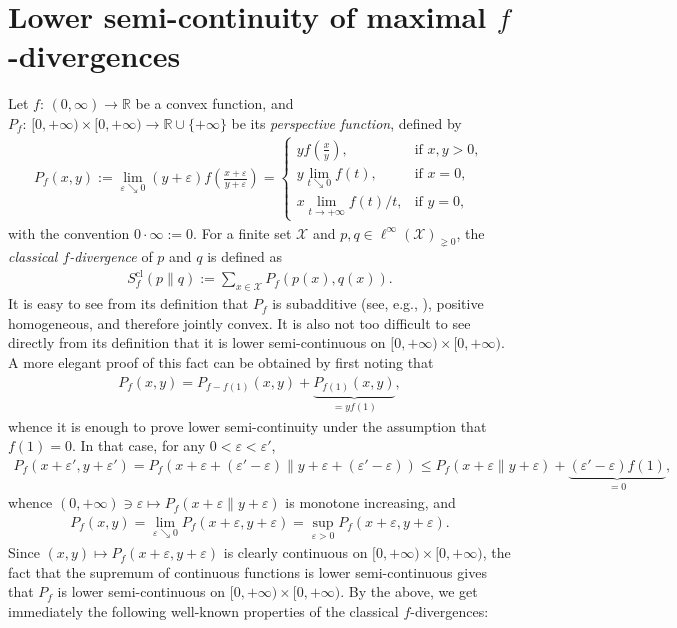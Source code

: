 \documentclass[unsortedaddress,superscriptaddress,pra,notitlepage]{revtex4}
\def\X{{\mathcal X}}
\def\bR{\mathbb{R}}
\def\ep{\varepsilon}
\def\bz{\left(}
\def\jz{\right)}
\def\pne{_{\gneq 0}}
\def\cl{\mathrm{cl}}
\def\cl{\mathrm{cl}}
\newcommand{\ki}[1]{\textit{\textit{#1}}}
\begin{document}
\appendix

\section{Lower semi-continuity of maximal $f$-divergences}
\label{sec:maxfdiv lsc}

Let $f:\,(0,\infty)\to\bR$ be a convex function, and 
$P_f:\,[0,+\infty)\times[0,+\infty)\to\bR\cup\{+\infty\}$ be its \ki{perspective function}, defined by 
\begin{align*}%
P_f(x,y):=\lim_{\ep\searrow 0}(y+\ep)f\bz\frac{x+\ep}{y+\ep}\jz
=
\begin{cases}
yf\bz\frac{x}{y}\jz, & \text{if $x,y>0$}, \\
y\lim_{t\searrow 0}f(t), & \text{if $x=0$}, \\
x\lim_{t\to+\infty}f(t)/t, & \text{if $y=0$},
\end{cases}
\end{align*}
with the convention $0\cdot\infty:=0$. For a finite set $\X$ and 
$p,q\in\ell^{\infty}(\X)\pne$, the \ki{classical $f$-divergence} of $p$ and $q$ is defined as
\cite{AliSilvey,Csiszarfdiv1,Csiszarfdiv2}
\begin{align*}
S_f^{\cl}(p\|q):=\sum_{x\in\X}P_f(p(x),q(x)).
\end{align*}
It is easy to see from its definition that $P_f$ is subadditive
(see, e.g., \cite[Lemma A.1]{HMPB}), positive homogeneous, and 
therefore jointly convex.
It is also not too difficult to see directly from its definition that it is lower 
semi-continuous on $[0,+\infty)\times[0,+\infty)$. A more elegant proof of this fact can
be obtained by first noting that 
\begin{align*}
P_f(x,y)=P_{f-f(1)}(x,y)+\underbrace{P_{f(1)}(x,y)}_{=yf(1)},
\end{align*}
whence it is enough to prove lower semi-continuity under the assumption that $f(1)=0$. In that case, for any $0<\ep<\ep'$, 
\begin{align*}
P_f(x+\ep',y+\ep')=P_f(x+\ep+(\ep'-\ep)\|y+\ep+(\ep'-\ep))
\le
P_f(x+\ep\|y+\ep)+\underbrace{(\ep'-\ep)f(1)}_{=0},
\end{align*}
whence $(0,+\infty)\ni\ep\mapsto P_f(x+\ep\|y+\ep)$ is monotone increasing, and 
\begin{align*}
P_f(x,y)=\lim_{\ep\searrow 0}P_f(x+\ep,y+\ep)=\sup_{\ep>0}P_f(x+\ep,y+\ep).
\end{align*}
Since $(x,y)\mapsto P_f(x+\ep,y+\ep)$ is clearly continuous on 
$[0,+\infty)\times[0,+\infty)$, the fact that the supremum of continuous functions is lower semi-continuous gives that 
$P_f$ is lower 
semi-continuous on $[0,+\infty)\times[0,+\infty)$.
By the above, we get immediately the following well-known properties of the classical $f$-divergences:
\end{document}
